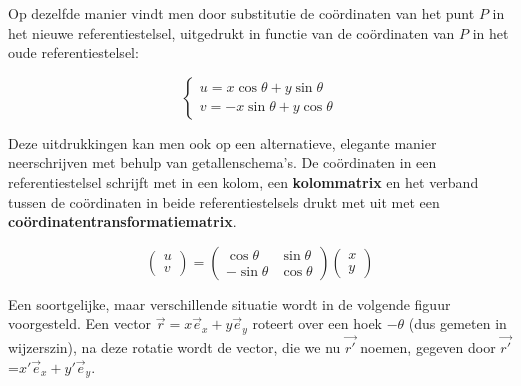 Op dezelfde manier vindt men door substitutie de co\"{o}rdinaten van het punt $P$ in het nieuwe referentiestelsel, uitgedrukt in functie van de co\"{o}rdinaten van $P$ in het oude referentiestelsel:

\[   
\left\{ \begin{array}{l}
u= x \cos \theta + y \sin \theta \\
v= -x \sin \theta + y \cos \theta \end{array} \right.
\]

Deze uitdrukkingen kan men ook op een alternatieve, elegante manier neerschrijven met behulp van getallenschema's. De co\"{o}rdinaten in een referentiestelsel schrijft met in een kolom, een {\bf kolommatrix} en het verband tussen de co\"{o}rdinaten in beide referentiestelsels drukt met uit met een {\bf co\"{o}rdinatentransformatiematrix}.

\[
\left( \begin{array}{l} u \\ v \end{array} \right)= \left( \begin{array}{rr} \cos \theta & \sin \theta \\ -\sin \theta & \cos \theta \end{array} \right) \left( \begin{array}{l} x \\ y \end{array} \right) 
\]

Een soortgelijke, maar verschillende situatie wordt in de volgende figuur voorgesteld. Een vector $\vec{r}=x \vec{e}_x + y \vec{e}_y$ roteert over een hoek $-\theta$ (dus gemeten in wijzerszin), na deze rotatie wordt de vector, die we nu $\vec{r'}$ noemen, gegeven door $\vec{r'}$=$x' \vec{e}_x + y' \vec{e}_y$. 

